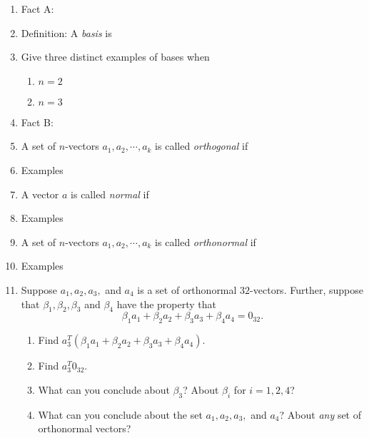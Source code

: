 \documentclass[11pt,fleqn]{article}
\begin{document}
\renewcommand{\headrulewidth}{0pt}
\newcommand{\blank}[1]{\rule{#1}{0.75pt}}
\renewcommand{\d}{\displaystyle}
\vspace*{-0.7in}
\begin{center}
  \large {}
\end{center}

\begin{enumerate}
\item Fact A: \\
\vspace{1in}
\item Definition: A \emph{basis} is\\
\vspace{1.5in}
\item Give three distinct examples of bases when
	\begin{enumerate}
	\item $n=2$\\
	\vfill
	\item $n=3$\\
	\vfill
	\end{enumerate}
\item Fact B: 
\vfill
\newpage
\item A set of $n$-vectors $a_1,a_2,\cdots,a_k$ is called \emph{orthogonal} if
\vspace{1in}
\item Examples\\
\vfill
\item A vector $a$ is called \emph{normal} if 
\vspace{.5in}
\item Examples\\
\vfill
\item A set of $n$-vectors $a_1,a_2,\cdots,a_k$ is called \emph{orthonormal} if
\vspace{1.5in}
\item Examples\\
\vfill
\newpage
\item Suppose $a_1,a_2,a_3,$ and $a_4$ is a set of orthonormal $32$-vectors. Further, suppose that $\beta_1, \beta_2, \beta_3$ and $\beta_4$ have the property that 
$$\beta_1a_1+\beta_2 a_2 +\beta_3 a_3 + \beta_4 a_4=0_{32}.$$
	\begin{enumerate}
	\item Find $a_3^T(\beta_1a_1+\beta_2 a_2 +\beta_3 a_3 + \beta_4 a_4)$.
	\vfill
	\item Find $a_3^T0_{32}.$
	\vfill
	\item What can you conclude about $\beta_3$? About $\beta_i$ for $i=1,2,4$?
	\vfill
	\item What can you conclude about the set $a_1,a_2,a_3,$ and $a_4$? About \emph{any} set of orthonormal vectors?
	\vfill
	\end{enumerate}
\end{enumerate}
\end{document}
